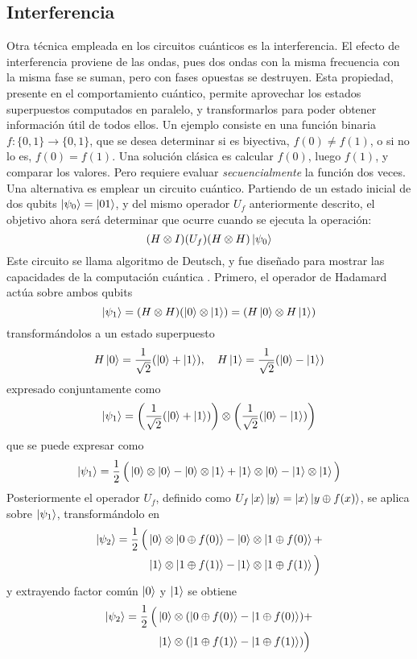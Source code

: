 \subsection{Interferencia}
Otra técnica empleada en los circuitos cuánticos es la interferencia. El efecto 
de interferencia proviene de las ondas, pues dos ondas con la misma frecuencia 
con la misma fase se suman, pero con fases opuestas se destruyen.  Esta 
propiedad, presente en el comportamiento cuántico, permite aprovechar los 
estados superpuestos computados en paralelo, y transformarlos para poder obtener 
información útil de todos ellos.
Un ejemplo consiste en una función binaria $f:\{0,1\} \rightarrow \{0,1\}$, que 
se desea determinar si es biyectiva, $f(0) \neq f(1)$, o si no lo es, $f(0) = 
f(1)$. Una solución clásica es calcular $f(0)$, luego $f(1)$, y comparar los 
valores. Pero requiere evaluar \textit{secuencialmente} la función dos veces.  
Una alternativa es emplear un circuito cuántico.
Partiendo de un estado inicial de dos qubits $\ket{\psi_{0}} = \ket{01}$, y del mismo 
operador $U_f$ anteriormente descrito, el objetivo ahora será determinar que 
ocurre cuando se ejecuta la operación:
$$ (H \otimes I)(U_f)(H \otimes H)\ket{\psi_{0}} $$
Este circuito se llama algoritmo de Deutsch, y fue diseñado para mostrar las 
capacidades de la computación cuántica \cite{deutsch85}.
Primero, el operador de Hadamard actúa sobre ambos qubits
$$ \ket{\psi_{1}} = (H \otimes H)(\ket{0} \otimes \ket{1}) =
(H \ket{0} \otimes H \ket{1})$$
transformándolos a un estado superpuesto
$$H \ket 0 = \frac{1}{\sqrt 2}(\ket 0 + \ket 1), \quad
H \ket 1 = \frac{1}{\sqrt 2}(\ket 0 - \ket 1)$$
expresado conjuntamente como
$$ \ket{\psi_{1}} = \left( \frac{1}{\sqrt 2}(\ket 0 + \ket 1) \right)
\otimes \left( \frac{1}{\sqrt 2}(\ket 0 - \ket 1) \right) $$
que se puede expresar como
$$ \ket{\psi_{1}} = \frac{1}{2} \, \Big( \ket{0} \otimes \ket{0} - \ket{0} \otimes \ket{1} + \ket{1} \otimes \ket{0} - \ket{1} \otimes \ket{1} \Big) $$
Posteriormente el operador $U_f$, definido como $ U_f \ket{x}\ket{y} = 
\ket{x}\ket{y \oplus f(x)}$, se aplica sobre $\ket{\psi_{1}}$, transformándolo en
\begin{equation*}
\begin{split}
\ket{\psi_{2}} = \frac{1}{2} \, \Big(
&\ket{0} \otimes \ket{0 \oplus f(0)} - \ket{0} \otimes \ket{1 \oplus f(0)} + \\
&\ket{1} \otimes \ket{1 \oplus f(1)} - \ket{1} \otimes \ket{1 \oplus f(1)} \Big)
\end{split}
\end{equation*}
y extrayendo factor común $\ket{0}$ y $\ket{1}$ se obtiene
\begin{equation*}
\begin{split}
\ket{\psi_{2}} = \frac{1}{2} \, \Big(
& \ket{0} \otimes ( \ket{0 \oplus f(0)} - \ket{1 \oplus f(0)} ) + \\
& \ket{1} \otimes ( \ket{1 \oplus f(1)} - \ket{1 \oplus f(1)} ) \Big)
\end{split}
\end{equation*}
